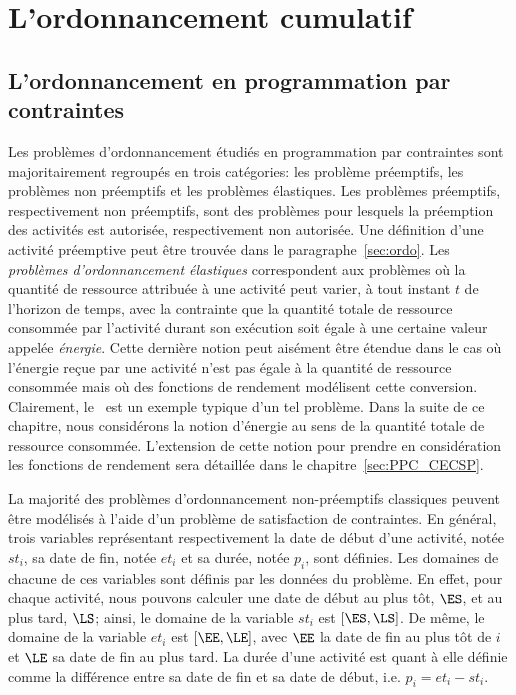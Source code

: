 \section{L'ordonnancement cumulatif}
\label{sec:cumu}

\subsection{L'ordonnancement en programmation par contraintes}
\label{sec:cumu_ordo}

Les problèmes d'ordonnancement étudiés en programmation par
contraintes sont majoritairement regroupés en trois catégories: les
problème préemptifs, les problèmes non préemptifs et les problèmes
élastiques. Les problèmes préemptifs, respectivement non préemptifs,
sont des problèmes pour lesquels la préemption des activités est
autorisée, respectivement non autorisée. Une définition d'une activité
préemptive peut être trouvée dans le paragraphe~\ref{sec:ordo}. Les
{\it problèmes d'ordonnancement élastiques} correspondent aux
problèmes où la quantité de ressource attribuée à une activité peut
varier, à tout instant $t$ de l'horizon de temps, avec la contrainte
que la quantité totale de ressource consommée par l'activité durant
son exécution soit égale à une certaine valeur appelée {\it
  énergie}. Cette dernière notion peut aisément être étendue dans le
cas où l'énergie reçue par une activité n'est pas égale à la quantité
de ressource consommée mais où des fonctions de rendement modélisent 
cette conversion. Clairement, le \CECSP~est un exemple typique d'un
tel problème. Dans la suite de ce chapitre, nous considérons la notion
d'énergie au sens de la quantité totale de ressource
consommée. L'extension de cette notion pour prendre en considération
les fonctions de rendement sera détaillée dans le
chapitre~\ref{sec:PPC_CECSP}.

La majorité des problèmes d'ordonnancement non-préemptifs classiques
peuvent être modélisés à l'aide d'un problème de satisfaction de
contraintes. En général, trois variables représentant respectivement
la date de début d'une activité, notée $st_i$, sa date de fin, notée
$et_i$ et sa durée, notée $p_i$, sont définies. Les domaines de
chacune de ces variables sont définis par les données du problème. En
effet, pour chaque activité, nous pouvons calculer une date de début
au plus tôt, $\ES$, et au plus tard, $\LS$; ainsi, le domaine de la
variable $st_i$ est $[\ES,\LS]$. De même, le domaine de la variable
$et_i$ est $[\EE,\LE]$, avec $\EE$ la date de fin au plus tôt de $i$
et $\LE$ sa date de fin au plus tard. La durée d'une activité est
quant à elle définie comme la différence entre sa date de fin et sa
date de début, i.e. $p_i=et_i-st_i$.

